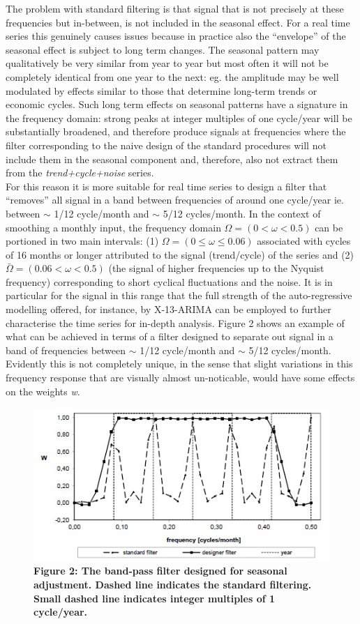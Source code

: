\documentclass{article}
\begin{document}
The problem with standard filtering is that signal that is not precisely at these frequencies but in-between, is not included in the seasonal effect. For a real time series this genuinely causes issues because in practice also the ``envelope'' of the seasonal effect is subject to long term changes. The seasonal pattern may qualitatively be very similar from year to year but most often it will not be completely identical from one year to the next: eg. the amplitude may be well modulated by effects similar to those that determine long-term trends or economic cycles. Such long term effects on seasonal patterns have a signature in the frequency domain: strong peaks at integer multiples of one cycle/year will be substantially broadened, and therefore produce signals at frequencies where the filter corresponding to the naive design of the standard procedures will not include them in the seasonal component and, therefore, also not extract them from the \textit{trend+cycle+noise} series.\\For this reason it is more suitable for real time series to design a filter that ``removes'' all signal in a band between frequencies of around one cycle/year ie. between $\sim$ 1/12 cycle/month and $\sim$ 5/12 cycles/month. In the context of smoothing a monthly input, the frequency domain $\Omega=(0<\omega<0.5)$ can be portioned in two main intervals: (1) $\Omega=(0 \leq \omega \leq 0.06)$ associated with cycles of 16 months or longer attributed to the signal (trend/cycle) of the series and (2) $\bar{\Omega}=(0.06 < \omega < 0.5)$ (the signal of higher frequencies up to the Nyquist frequency) corresponding to short cyclical fluctuations and the noise. It is in particular for the signal in this range that the full strength of the auto-regressive modelling offered, for instance, by X-13-ARIMA can be employed to further characterise the time series for in-depth analysis. Figure 2 shows an example of what can be achieved in terms of a filter designed to separate out signal in a band of frequencies between $\sim$ 1/12 cycle/month and $\sim$ 5/12 cycles/month. Evidently this is not completely unique, in the sense that slight variations in this frequency response that are visually almost un-noticable, would have some effects on the weights \textit{w}.
\begin{figure}[H]
  \includegraphics[width=\linewidth]{../images/capitolo2/filters.jpg}
 {\textbf{\scriptsize Figure 2: The band-pass filter designed for seasonal adjustment. Dashed line indicates the standard filtering. Small dashed line indicates integer multiples of 1 cycle/year.}}
\end{figure}
\end{document}
